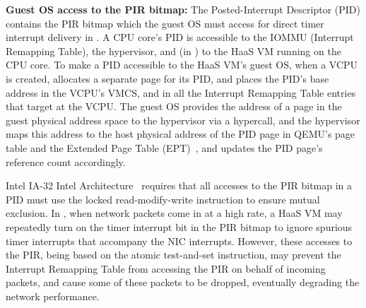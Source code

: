 {\bf Guest OS access to the PIR bitmap:}
The Posted-Interrupt Descriptor (PID) contains the PIR bitmap 
which the guest OS must access for direct timer interrupt delivery in \sna.
A CPU core's PID is accessible to the IOMMU (Interrupt Remapping Table), 
the hypervisor, and (in \sna) to  the HaaS VM running on the CPU core. 
To make a PID accessible to the HaaS VM's guest OS,
when a VCPU is created, \na allocates a separate page for its PID, 
and places the PID's base address in the VCPU's VMCS, and 
in all the Interrupt Remapping Table entries that target at the VCPU.
The guest OS provides the address of a page in the guest physical address 
space to the hypervisor via a hypercall, and the hypervisor maps this address 
to the host physical address of the PID page in QEMU's page table and 
the Extended Page Table (EPT)~\cite{ept-wiki}, and updates the 
PID page's reference count accordingly.
   

Intel IA-32 Intel Architecture~\cite{sdm:2018}  requires that all accesses to the PIR bitmap in a PID
must use the locked read-modify-write instruction to ensure mutual exclusion. 
In \sna, when network packets come in at a high rate, a HaaS VM may repeatedly turn 
on the timer interrupt bit in the PIR bitmap to ignore  spurious timer interrupts that 
accompany the NIC interrupts. However, these accesses to the PIR, being based on the
atomic test-and-set instruction, may prevent the Interrupt Remapping Table from 
accessing the PIR on behalf of incoming packets, and cause some of these 
packets to be dropped, eventually degrading the network performance.
 
